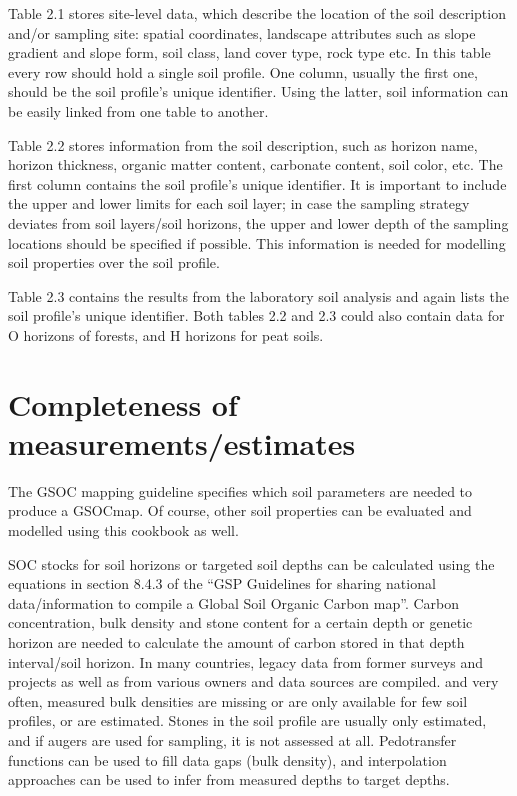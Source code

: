 \documentclass[]{book}
\theoremstyle{definition}
\theoremstyle{definition}
\theoremstyle{definition}
\theoremstyle{remark}
\begin{document}
Table 2.1 stores site-level data, which describe the location of the
soil description and/or sampling site: spatial coordinates, landscape
attributes such as slope gradient and slope form, soil class, land cover
type, rock type etc. In this table every row should hold a single soil
profile. One column, usually the first one, should be the soil profile's
unique identifier. Using the latter, soil information can be easily
linked from one table to another.

Table 2.2 stores information from the soil description, such as horizon
name, horizon thickness, organic matter content, carbonate content, soil
color, etc. The first column contains the soil profile's unique
identifier. It is important to include the upper and lower limits for
each soil layer; in case the sampling strategy deviates from soil
layers/soil horizons, the upper and lower depth of the sampling
locations should be specified if possible. This information is needed
for modelling soil properties over the soil profile.

Table 2.3 contains the results from the laboratory soil analysis and
again lists the soil profile's unique identifier. Both tables 2.2 and
2.3 could also contain data for O horizons of forests, and H horizons
for peat soils.

\section{Completeness of
measurements/estimates}\label{completeness-of-measurementsestimates}

The GSOC mapping guideline specifies which soil parameters are needed to
produce a GSOCmap. Of course, other soil properties can be evaluated and
modelled using this cookbook as well.

SOC stocks for soil horizons or targeted soil depths can be calculated
using the equations in section 8.4.3 of the ``GSP Guidelines for sharing
national data/information to compile a Global Soil Organic Carbon map''.
Carbon concentration, bulk density and stone content for a certain depth
or genetic horizon are needed to calculate the amount of carbon stored
in that depth interval/soil horizon. In many countries, legacy data from
former surveys and projects as well as from various owners and data
sources are compiled. and very often, measured bulk densities are
missing or are only available for few soil profiles, or are estimated.
Stones in the soil profile are usually only estimated, and if augers are
used for sampling, it is not assessed at all. Pedotransfer functions can
be used to fill data gaps (bulk density), and interpolation approaches
can be used to infer from measured depths to target depths.
\end{document}

